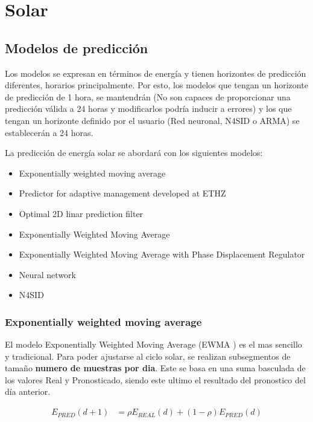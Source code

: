 \section{Solar} 
\label{sec:solar}


\subsection{Modelos de predicción} 
\label{sub:modelos_de_prediccion}

Los modelos se expresan en términos de energía y tienen horizontes de predicción diferentes, horarios principalmente. Por esto, los modelos que tengan un horizonte de predicción de 1 hora, se mantendrán (No son capaces de proporcionar una predicción válida a 24 horas y modificarlos podría inducir a errores) y los que tengan un horizonte definido por el usuario (Red neuronal, N4SID o ARMA) se establecerán a 24 horas. 

La predicción de energía solar se abordará con los siguientes modelos:
\begin{itemize}
	\item Exponentially weighted moving average
	\item Predictor for adaptive management developed at ETHZ
	\item Optimal 2D linar prediction filter
	\item Exponentially Weighted Moving Average
	\item Exponentially Weighted Moving Average with Phase Displacement Regulator
	\item Neural network
	\item N4SID
\end{itemize}


\subsubsection{ Exponentially weighted moving average } 
\label{ssub:subsubsection_name}

El modelo Exponentially Weighted Moving Average (EWMA \cite{ewma}) es el mas sencillo y tradicional. Para poder ajustarse al ciclo solar, se realizan subsegmentos de tamaño \textbf{numero de muestras por dia}. 
Este se basa en una suma basculada de los valores Real y Pronosticado, siendo este ultimo el resultado del pronostico del día anterior.

\begin{align}
	E_{PRED}(d+1) &= \rho E_{REAL}(d) + (1-\rho) E_{PRED}(d)
\end{align}

